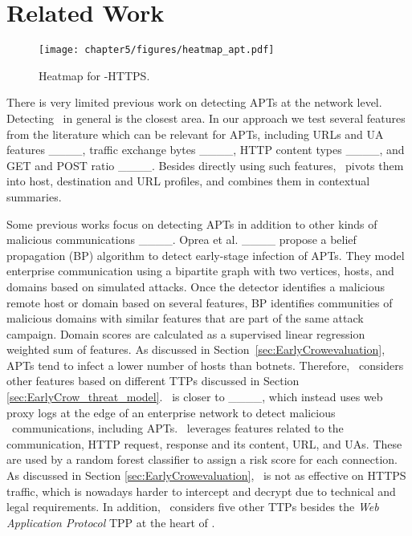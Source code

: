 \section{Related Work}
\label{sec:earlycrow-related-work}

\begin{figure*}[!t]
\centering
\texttt{[image: chapter5/figures/heatmap\_apt.pdf]}
\caption{Heatmap for \earlycrow-HTTPS.}\label{fig:heat_mao}
\end{figure*}


There is very limited previous work on detecting APTs at the network level. 
%
Detecting \cc\ in general is the closest area.
%
In our approach we test several features from the literature which can be relevant for APTs, including URLs and UA features ____, traffic exchange bytes ____, HTTP content types ____, and GET and POST ratio ____. Besides directly using such features, \earlycrow\ pivots them into host, destination and URL profiles, and combines them in contextual summaries. 
%

Some previous works focus on detecting APTs in addition to other kinds of malicious communications ____. 
%
Oprea et al. ____ propose a belief propagation (BP) algorithm to detect early-stage infection of APTs. 
%
They model enterprise communication using a bipartite graph with two vertices, hosts, and domains based on simulated attacks.
%
Once the detector identifies a malicious remote host or domain based on several features, BP identifies communities of malicious domains with similar features that are part of the same attack campaign. 
%
Domain scores are calculated as a supervised linear regression weighted sum of features.
%
As discussed in Section~\ref{sec:EarlyCrowevaluation}, APTs tend to infect a lower number of hosts than botnets. 
%
Therefore, \earlycrow\ considers other features based on different TTPs discussed in Section \ref{sec:EarlyCrow_threat_model}. 
%
\earlycrow\ is closer to \made____, which instead uses web proxy logs at the edge of an enterprise network to detect malicious \cc\ communications, including APTs. 
%
\made\ leverages features related to the communication, HTTP request, response and its content, URL, and UAs.
%
These are used by a random forest classifier to assign a risk score for each connection. 
%
As discussed in Section \ref{sec:EarlyCrowevaluation}, \made\ is not as effective on HTTPS traffic, which is nowadays harder to intercept and decrypt due to technical and legal requirements. 
%
In addition, \earlycrow\ considers five other TTPs besides the \textit{Web Application Protocol} TPP at the heart of \made. 



